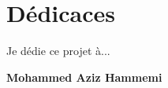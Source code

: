 \chapter*{Dédicaces }

\begin{center}

\begin{minipage}[c]{1\columnwidth}

{\large 
\vskip1cm

\centering
Je dédie ce projet à...
}


\end{minipage}

\end{center}

\vskip1.5cm
\begin{flushright}\LARGE
\bf{Mohammed Aziz Hammemi}
\end{flushright}